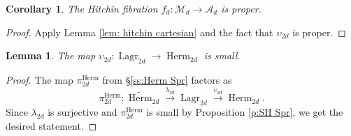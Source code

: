 \documentclass[reqno]{amsart}
\numberwithin{equation}{section}
\newcommand{\wt}[1]{\widetilde{#1}}
\newcommand{\Cal}[1]{\mathcal{#1}}
\newcommand{\co}{\colon}
\DeclareMathOperator{\SO}{SO}
\DeclareMathOperator{\Lie}{Lie}
\DeclareMathOperator{\Herm}{Herm}
\DeclareMathOperator{\Lagr}{Lagr}
\newcommand\xr{\xrightarrow}
\newcommand\so{\mathfrak{so}}
\newcommand\Og{\mathrm{O}}
\renewcommand{\l}{\lambda}
\newcommand\frp{\mathfrak{p}}
\newtheorem{lemma}[thm]{Lemma}
\newtheorem{cor}[thm]{Corollary}
\theoremstyle{remark}
\numberwithin{equation}{section}
\begin{document}
\begin{cor}\label{c: hitchin proper}
The Hitchin fibration $f_{d} \co \Cal{M}_{d} \rightarrow \Cal{A}_{d}$ is proper.
\end{cor}
\begin{proof}Apply Lemma \ref{lem: hitchin cartesian} and the fact that $\upsilon_{2d}$ is proper.
\end{proof}



\begin{lemma}\label{l:Lag small}
The map $\upsilon_{2d} \co \Lagr_{2d} \rightarrow \Herm_{2d}$ is small.
\end{lemma}
\begin{proof}
The map $\pi^{\Herm}_{2d}$ from \S\ref{ss:Herm Spr} factors as 
\begin{equation}\label{factor pi Herm}
\pi^{\Herm}_{2d}: \wt\Herm_{2d}\xr{\l_{2d}}\Lagr_{2d}\xr{\upsilon_{2d}}\Herm_{2d}.
\end{equation}
Since $\l_{2d}$ is surjective and $\pi^{\Herm}_{2d}$ is small by Proposition \ref{p:SH Spr}, we get the desired statement.
\end{proof}

\end{document}
